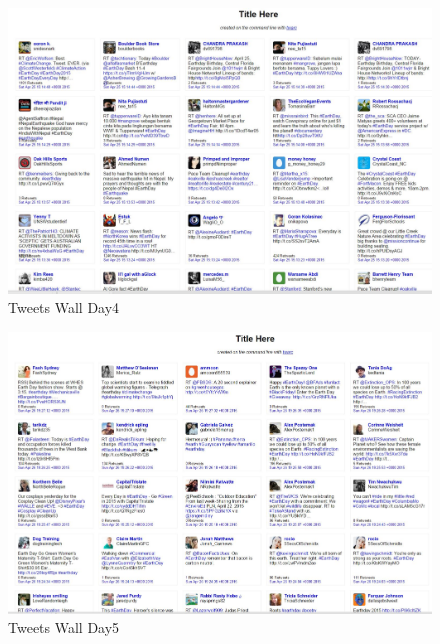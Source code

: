 \begin{figure}[ht]
	\begin{center}
		 \includegraphics[scale=0.40]{Day4Wall}
		  \caption{Tweets Wall Day4}
	 \end{center}
\end{figure}
\begin{figure}[ht]
	\begin{center}
		 \includegraphics[scale=0.40]{Day5Wall}
		  \caption{Tweets Wall Day5}
	 \end{center}
\end{figure}
